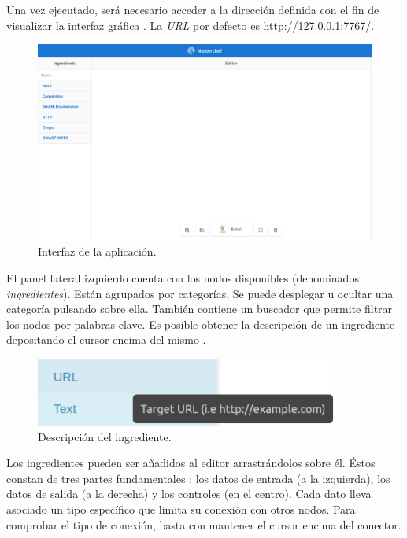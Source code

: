 Una vez ejecutado, será necesario acceder a la dirección definida con el fin de visualizar la interfaz gráfica . La \textit{URL} por defecto es \url{http://127.0.0.1:7767/}.\sn

\begin{figure}[H]
    \centering
    \includegraphics[width=15cm]{img/tables/40_Interface.png}
    \caption{Interfaz de la aplicación.}
    \label{fig:justtheinterface}
\end{figure}

El panel lateral izquierdo cuenta con los nodos disponibles (denominados \textit{ingredientes}). Están agrupados por categorías. Se puede desplegar u ocultar una categoría pulsando sobre ella. También contiene un buscador que permite filtrar los nodos por palabras clave. Es posible obtener la descripción de un ingrediente depositando el cursor encima del mismo .\sn

\begin{figure}[H]
    \centering
    \includegraphics[width=10cm]{img/tables/41_Ingredient-Tooltip.png}
    \caption{Descripción del ingrediente.}
    \label{fig:ingrdesc}
\end{figure}

Los ingredientes pueden ser añadidos al editor arrastrándolos sobre él. Éstos constan de tres partes fundamentales : los datos de entrada (a la izquierda), los datos de salida (a la derecha) y los controles (en el centro). Cada dato lleva asociado un tipo específico que limita su conexión con otros nodos. Para comprobar el tipo de conexión, basta con mantener el cursor encima del conector.\sn

